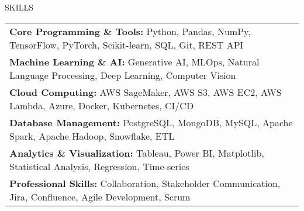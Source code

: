 \begin{rSection}{SKILLS}
    \begin{tabular}{ @{} p{\textwidth} @{} }
    \textbf{Core Programming \& Tools:} Python, Pandas, NumPy, TensorFlow, PyTorch, Scikit-learn, SQL, Git, REST API  \\
    \textbf{Machine Learning \& AI:} Generative AI, MLOps, Natural Language Processing, Deep Learning, Computer Vision \\
    \textbf{Cloud Computing:} AWS SageMaker, AWS S3, AWS EC2, AWS Lambda, Azure, Docker, Kubernetes, CI/CD \\
    \textbf{Database Management:} PostgreSQL, MongoDB, MySQL, Apache Spark, Apache Hadoop, Snowflake, ETL \\
    \textbf{Analytics \& Visualization:} Tableau, Power BI, Matplotlib, Statistical Analysis, Regression, Time-series \\
    \textbf{Professional Skills:} Collaboration, Stakeholder Communication, Jira, Confluence, Agile Development, Scrum
    \end{tabular}
\end{rSection}